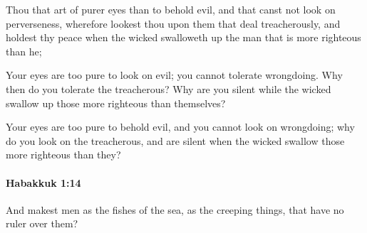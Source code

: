 			\begin{versebox}
					\item[BHS] 
					\item[LXX] 
					\item[ASV] Thou that art of purer eyes than to behold evil, and that canst not look on perverseness, wherefore lookest thou upon them that deal treacherously, and holdest thy peace when the wicked swalloweth up the man that is more righteous than he;
					\item[NIV] Your eyes are too pure to look on evil; you cannot tolerate wrongdoing. Why then do you tolerate the treacherous? Why are you silent while the wicked swallow up those more righteous than themselves?
					\item[NRSV] Your eyes are too pure to behold evil, and you cannot look on wrongdoing; why do you look on the treacherous, and are silent when the wicked swallow those more righteous than they?
			\end{versebox}

		\paragraph{Habakkuk 1:14} %
			\label{HABAKKUK-1-14}

			And makest men as the fishes of the sea, as the creeping things, that have no ruler over them?

